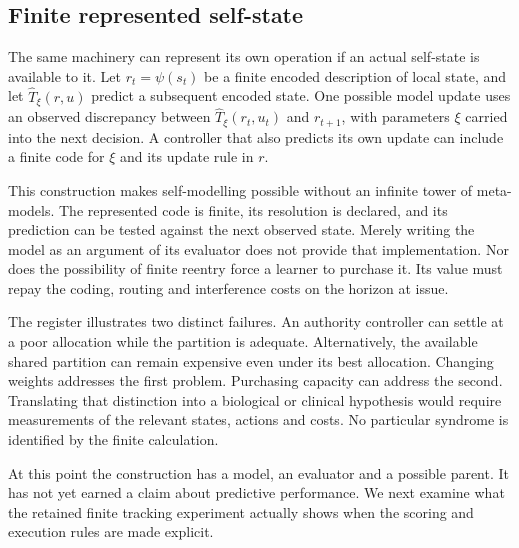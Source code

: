 \subsection{Finite represented self-state}

The same machinery can represent its own operation if an actual self-state is available to it. Let \(r_t=\psi(s_t)\) be a finite encoded description of local state, and let \(\widehat T_\xi(r,u)\) predict a subsequent encoded state. One possible model update uses an observed discrepancy between
\(\widehat T_\xi(r_t,u_t)\) and \(r_{t+1}\), with parameters \(\xi\) carried into the next decision. A controller that also predicts its own update can include a finite code for \(\xi\) and its update rule in \(r\).

This construction makes self-modelling possible without an infinite tower of meta-models. The represented code is finite, its resolution is declared, and its prediction can be tested against the next observed state. Merely writing the model as an argument of its evaluator does not provide that implementation. Nor does the possibility of finite reentry force a learner to purchase it. Its value must repay the coding, routing and interference costs on the horizon at issue.

The register illustrates two distinct failures. An authority controller can settle at a poor allocation while the partition is adequate. Alternatively, the available shared partition can remain expensive even under its best allocation. Changing weights addresses the first problem. Purchasing capacity can address the second. Translating that distinction into a biological or clinical hypothesis would require measurements of the relevant states, actions and costs. No particular syndrome is identified by the finite calculation.

At this point the construction has a model, an evaluator and a possible parent. It has not yet earned a claim about predictive performance. We next examine what the retained finite tracking experiment actually shows when the scoring and execution rules are made explicit.
